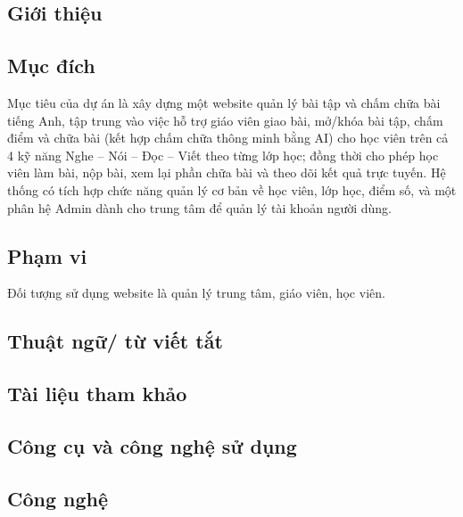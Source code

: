 \documentclass[12pt,a4paper]{article}
\begin{document}
\clearpage

\begin{center}
\section{Giới thiệu}
\end{center}

\subsection{Mục đích}

Mục tiêu của dự án là xây dựng một website quản lý bài tập và chấm chữa bài tiếng Anh, tập trung vào việc hỗ trợ giáo viên giao bài, mở/khóa bài tập, chấm điểm và chữa bài (kết hợp chấm chữa thông minh bằng AI) cho học viên trên cả 4 kỹ năng Nghe – Nói – Đọc – Viết theo từng lớp học; đồng thời cho phép học viên làm bài, nộp bài, xem lại phần chữa bài và theo dõi kết quả trực tuyến. Hệ thống có tích hợp chức năng quản lý cơ bản về học viên, lớp học, điểm số, và một phân hệ Admin dành cho trung tâm để quản lý tài khoản người dùng. 

\subsection{Phạm vi}

Đối tượng sử dụng website là quản lý trung tâm, giáo viên, học viên.

\subsection{Thuật ngữ/ từ viết tắt}

\subsection{Tài liệu tham khảo}

\clearpage

\begin{center}
\section{Công cụ và công nghệ sử dụng}
\end{center}

\subsection{Công nghệ}
\end{document}
